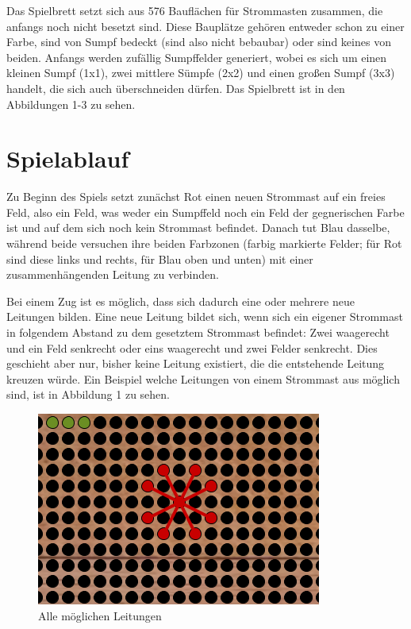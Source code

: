 \documentclass[a4paper, ngerman]{scrartcl}
\begin{document}
Das Spielbrett setzt sich aus 576 Bauflächen für Strommasten zusammen,
die anfangs noch nicht besetzt sind. Diese Bauplätze gehören entweder
schon zu einer Farbe, sind von Sumpf bedeckt (sind also nicht
bebaubar) oder sind keines von beiden. Anfangs werden zufällig
Sumpffelder generiert, wobei es sich um einen kleinen Sumpf (1x1), zwei
mittlere Sümpfe (2x2) und einen großen Sumpf (3x3) handelt, die sich
auch überschneiden dürfen. Das Spielbrett ist in den Abbildungen 1-3
zu sehen.

\section{Spielablauf}

Zu Beginn des Spiels setzt zunächst Rot einen neuen Strommast auf ein
freies Feld, also ein Feld, was weder ein Sumpffeld noch ein Feld der
gegnerischen Farbe ist und auf dem sich noch kein Strommast
befindet. Danach tut Blau dasselbe, während beide versuchen ihre
beiden Farbzonen (farbig markierte Felder; für Rot sind diese links
und rechts, für Blau oben und unten) mit einer zusammenhängenden
Leitung zu verbinden.

Bei einem Zug ist es möglich, dass sich dadurch eine oder mehrere neue
Leitungen bilden. Eine neue Leitung bildet sich, wenn sich ein eigener
Strommast in folgendem Abstand zu dem gesetztem Strommast befindet:
Zwei waagerecht und ein Feld senkrecht oder eins waagerecht und zwei
Felder senkrecht. Dies geschieht aber nur, bisher keine Leitung
existiert, die die entstehende Leitung kreuzen würde. Ein Beispiel
welche Leitungen von einem Strommast aus möglich sind, ist in
Abbildung 1 zu sehen.

\begin{figure}[h!]
  \centering
  \includegraphics[scale = 0.8]{bilder/setzzug.png}
  \caption{Alle möglichen Leitungen}
  \label{fig:Leitungen}
\end{figure}
\end{document}
